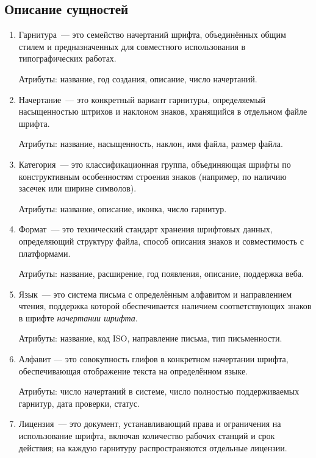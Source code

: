 \subsection{Описание сущностей}

\begin{enumerate}
    \item Гарнитура~--- это семейство начертаний шрифта, объединённых общим стилем и предназначенных для совместного использования в типографических работах.

    Атрибуты: название, год создания, описание, число начертаний.

    \item Начертание~--- это конкретный вариант гарнитуры, определяемый насыщенностью штрихов и наклоном знаков, хранящийся в отдельном файле шрифта.

    Атрибуты: название, насыщенность, наклон, имя файла, размер файла.

    \item Категория~--- это классификационная группа, объединяющая шрифты по конструктивным особенностям строения знаков (например, по наличию засечек или ширине символов).

    Атрибуты: название, описание, иконка, число гарнитур.

    \item Формат~--- это технический стандарт хранения шрифтовых данных, определяющий структуру файла, способ описания знаков и совместимость с платформами.

    Атрибуты: название, расширение, год появления, описание, поддержка веба.

    \item Язык~--- это система письма с определённым алфавитом и направлением чтения, поддержка которой обеспечивается наличием соответствующих знаков в шрифте \textit{начертании шрифта}.

    Атрибуты: название, код ISO, направление письма, тип письменности.

    \item Алфавит — это совокупность глифов в конкретном начертании шрифта, обеспечивающая отображение текста на определённом языке.

    Атрибуты: число начертаний в системе, число полностью поддерживаемых гарнитур, дата проверки, статус.

    \item Лицензия~--- это документ, устанавливающий права и ограничения на использование шрифта, включая количество рабочих станций и срок действия; на каждую гарнитуру распространяются отдельные лицензии.


\end{enumerate}
